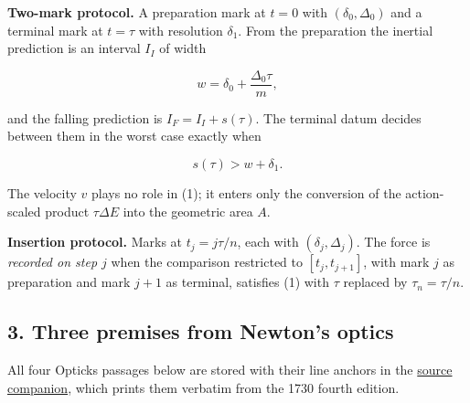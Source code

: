 \documentclass[11pt,a4paper]{article}
\begin{document}
\textbf{Two-mark protocol.} A preparation mark at \(t=0\) with
\((\delta_0,\Delta_0)\) and a terminal mark at \(t=\tau\) with
resolution \(\delta_1\). From the preparation the inertial prediction is
an interval \(I_I\) of width

\[w=\delta_0+\frac{\Delta_0\tau}{m},\]

and the falling prediction is \(I_F=I_I+s(\tau)\). The terminal datum
decides between them in the worst case exactly when

\[s(\tau)>w+\delta_1. \tag{1}\]

The velocity \(v\) plays no role in (1); it enters only the conversion
of the action-scaled product \(\tau\Delta E\) into the geometric area
\(A\).

\textbf{Insertion protocol.} Marks at \(t_j=j\tau/n\), each with
\((\delta_j,\Delta_j)\). The force is \emph{recorded on step \(j\)} when
the comparison restricted to \([t_j,t_{j+1}]\), with mark \(j\) as
preparation and mark \(j+1\) as terminal, satisfies (1) with \(\tau\)
replaced by \(\tau_n=\tau/n\).

\hypertarget{three-premises-from-newtons-optics}{%
\subsection{3. Three premises from Newton's
optics}\label{three-premises-from-newtons-optics}}

All four Opticks passages below are stored with their line anchors in
the
\href{../docs/classics/Newton_Opticks_1730_fits_and_queries.md}{source
companion}, which prints them verbatim from the 1730 fourth edition.
\end{document}
